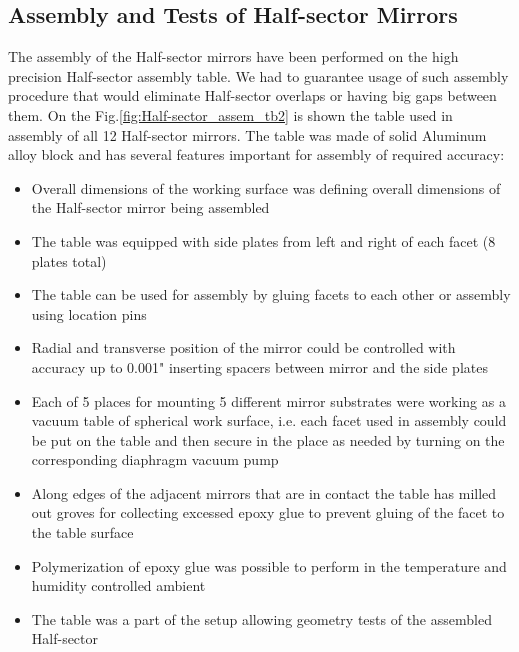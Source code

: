 \subsection{Assembly and Tests of Half-sector Mirrors}
The assembly of the Half-sector mirrors have been performed on the high precision Half-sector assembly table. We had to guarantee usage of such assembly procedure that would eliminate Half-sector overlaps or having big gaps between them. On the Fig.\ref{fig:Half-sector_assem_tb2} is shown the table used in assembly of all 12 Half-sector mirrors. The table was made of solid Aluminum alloy block and has several features important for assembly of required accuracy:
\begin{itemize}
    \item Overall dimensions of the working surface was defining overall dimensions of the Half-sector mirror being assembled 
    \item The table was equipped with side plates from left and right of each facet (8 plates total)
    \item The table can be used for assembly by gluing facets to each other or assembly using location pins
    \item Radial and transverse position of the mirror could be controlled with accuracy up to 0.001" inserting spacers between mirror and the side plates
    \item Each of 5 places for mounting 5 different mirror substrates were working as a vacuum table of spherical work surface, i.e. each  facet used in assembly could  be put on the table and then secure in the place as needed by turning on the corresponding  diaphragm vacuum pump
    \item Along edges of the adjacent mirrors that are in contact the table has milled out groves for collecting excessed epoxy glue to prevent gluing of the facet to the table surface
    \item Polymerization of epoxy glue was possible to perform in the temperature and humidity controlled ambient   
    \item The table was a part of the setup allowing geometry tests of the assembled Half-sector
\end{itemize}

